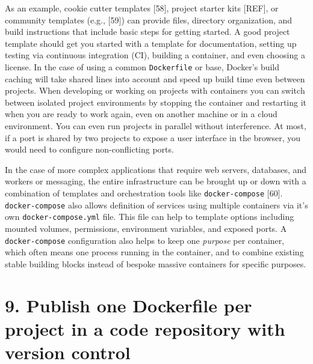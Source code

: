 \documentclass[10pt,letterpaper]{article}
\begin{document}
As an example, cookie cutter templates {[}58{]}, project starter kits
{[}REF{]}, or community templates (e.g., {[}59{]}) can provide files,
directory organization, and build instructions that include basic steps
for getting started. A good project template should get you started with
a template for documentation, setting up testing via continuous
integration (CI), building a container, and even choosing a license. In
the case of using a common \texttt{Dockerfile} or base, Docker's build
caching will take shared lines into account and speed up build time even
between projects. When developing or working on projects with containers
you can switch between isolated project environments by stopping the
container and restarting it when you are ready to work again, even on
another machine or in a cloud environment. You can even run projects in
parallel without interference. At most, if a port is shared by two
projects to expose a user interface in the browser, you would need to
configure non-conflicting ports.

In the case of more complex applications that require web servers,
databases, and workers or messaging, the entire infrastructure can be
brought up or down with a combination of templates and orchestration
tools like \texttt{docker-compose} {[}60{]}. \texttt{docker-compose}
also allows definition of services using multiple containers via it's
own \texttt{docker-compose.yml} file. This file can help to template
options including mounted volumes, permissions, environment variables,
and exposed ports. A \texttt{docker-compose} configuration also helps to
keep one \emph{purpose} per container, which often means one process
running in the container, and to combine existing stable building blocks
instead of bespoke massive containers for specific purposes.

\hypertarget{publish-one-dockerfile-per-project-in-a-code-repository-with-version-control}{%
\section*{9. Publish one Dockerfile per project in a code repository
with version
control}\label{publish-one-dockerfile-per-project-in-a-code-repository-with-version-control}}

  \label{rule:publish} 
\end{document}
